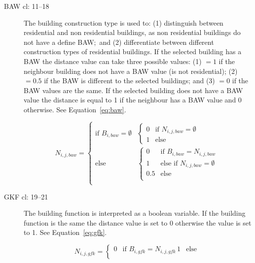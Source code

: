 \begin{description}
    \item[BAW cl: 11--18] The building construction type is used to: (1)
        distinguish between residential and non residential buildings, as non
        residential buildings do not have a define BAW;\ and (2) differentiate
        between different construction types of residential buildings.
        If the selected building has a BAW the distance value can take three
        possible values: (1) $=1$ if the neighbour building does not have a BAW
        value (is not residential); (2) $=0.5$ if the BAW is different to the
        selected buildings; and (3) $=0$ if the BAW values are the same.
        If the selected building does not have a BAW value the distance is
        equal to 1 if the neighbour has a BAW value and 0 otherwise. See
        Equation~\ref{eq:baw}.

\begin{equation}\label{eq:baw}
N_{i,j,baw} = 
  \begin{cases}
      \text{if } B_{i,baw} = \emptyset & 
      \begin{cases}
          0     & \text{if } N_{i,j,baw} = \emptyset\\
          1     & \text{else }
      \end{cases}\\
      \text{else } &
      \begin{cases}
          0 	& \text{if } B_{i,baw} = N_{i,j,baw}\\
          1     & \text{else if } N_{i,j,baw} = \emptyset\\
          0.5 	& \text{else}\\
      \end{cases}\\
  \end{cases}
\end{equation}

    \item[GKF cl: 19--21] The building function is interpreted as a boolean
        variable. If the building function is the same the distance value is
        set to 0 otherwise the value is set to 1. See Equation~\ref{eq:gfk}.
        
\begin{equation}\label{eq:gfk}
N_{i,j,gfk} = 
  \begin{cases}
      0 & \text{if } B_{i,gfk} = N_{i,j,gfk} \,
      1 & \text{else } \\
  \end{cases}
\end{equation}


\end{description}
